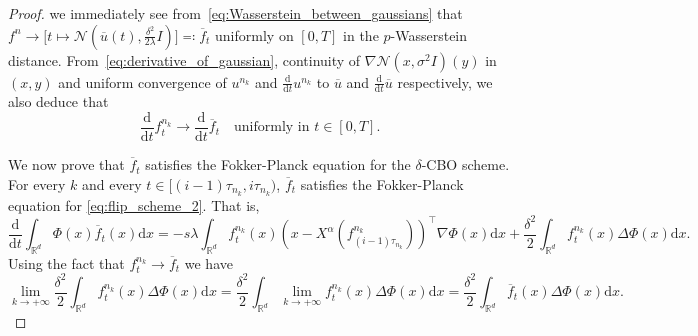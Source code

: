 \documentclass[reqno]{amsart}
\numberwithin{algorithm}{section}
\newcommand{\diff}{\mathrm{d}}
\newcommand{\Xalpha}{{X^\alpha}}
\begin{document}
{\begin{proof}
we immediately see from~\eqref{eq:Wasserstein_between_gaussians} that $f^n \to \big[t \mapsto \mathcal{N}(\overline{u}(t), \frac{\delta^2}{2\lambda}I)\big] \eqqcolon \overline{f}_t$ uniformly on $[0,T]$ in the $p$-Wasserstein distance. From~\eqref{eq:derivative_of_gaussian}, continuity of $\nabla \mathcal N(x, \sigma^2 I)(y)$ in $(x, y)$ and uniform convergence of $u^{n_k}$ and $\frac{\diff}{\diff t}u^{n_k}$ to $\overline{u}$ and $\frac{\diff}{\diff t}\overline{u}$ respectively, we also deduce that
\begin{equation}\label{eq:derivative_convergence}
    \frac{\diff}{\diff t} f^{n_k}_{t} \to \frac{\diff}{\diff t} \overline{f}_t \quad \text{uniformly in } t \in [0,T].
\end{equation}

We now prove that $\overline{f}_t$ satisfies the Fokker-Planck equation for the $\delta$-CBO scheme.
For every $k$ and every $t\in [(i-1)\tau_{n_k}, i\tau_{n_k})$, $\overline{f}_t$ satisfies the Fokker-Planck equation for \eqref{eq:flip_scheme_2}. That is, 
\begin{equation}\label{FP1}
    \frac{\diff}{\diff t}\int_{\mathbb{R}^d}\Phi(x)\overline{f}_t(x)\diff x = -s\lambda \int_{\mathbb{R}^d}f^{n_k}_t(x)\left(x-\Xalpha(f^{n_k}_{(i-1)\tau_{n_k}})\right)^\top \nabla \Phi(x) \diff x + \frac{\delta^2}{2}\int_{\mathbb{R}^d}f^{n_k}_t(x)\Delta\Phi(x)\diff x.
\end{equation}
Using the fact that $f^{n_k}_t\rightarrow\overline{f}_t$ we have
\begin{equation}\label{I1}
   \lim_{k\rightarrow+\infty}\frac{\delta^2}{2}\int_{\mathbb{R}^d}f^{n_k}_t(x)\Delta\Phi(x)\diff x = \frac{\delta^2}{2}\int_{\mathbb{R}^d}\lim_{k\rightarrow+\infty}f^{n_k}_t(x)\Delta\Phi(x)\diff x  = \frac{\delta^2}{2}\int_{\mathbb{R}^d}\overline{f}_t(x)\Delta\Phi(x)\diff x. 
\end{equation}


\end{proof}}
\end{document}

